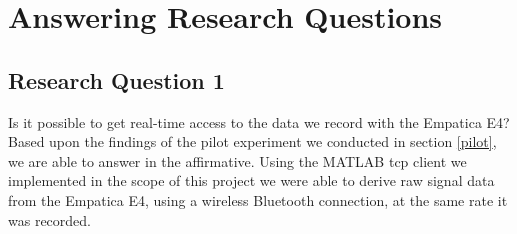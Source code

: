 \section{Answering Research Questions}
\subsection{Research Question 1} 
Is it possible to get real-time access to the data we record with the Empatica E4?\\[10pt]
Based upon the findings of the pilot experiment we conducted in section \ref{pilot}, we are able to answer in the affirmative. Using the MATLAB \gls{tcp} client we implemented in the scope of this project we were able to derive raw signal data from the Empatica E4, using a wireless Bluetooth connection, at the same rate it was recorded.

